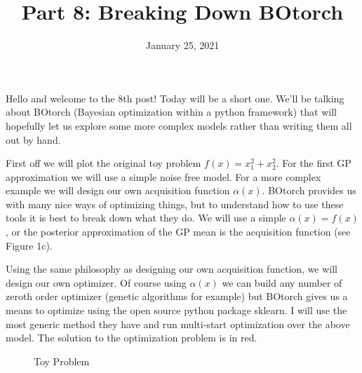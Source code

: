 \documentclass[12pt]{article}
\title{\textbf{Part 8: Breaking Down BOtorch}}
\begin{document}
\date{January 25, 2021}
\maketitle

Hello and welcome to the 8th post! Today will be a short one. We'll be talking about BOtorch (Bayesian optimization within a python framework) that will hopefully let us explore some more complex models rather than writing them all out by hand.

\vspace{5mm}

First off we will plot the original toy problem $f(x)=x_1^2+x_2^2$. For the first GP approximation we will use a simple noise free model. For a more complex example we will design our own acquisition function $\alpha(x)$. BOtorch provides us with many nice ways of optimizing things, but to understand how to use these tools it is best to break down what they do. We will use a simple $\alpha(x)=f(x)$, or the posterior approximation of the GP mean is the acquisition function (see Figure 1c).

\vspace{5mm}

Using the same philosophy as designing our own acquisition function, we will design our own optimizer. Of course using $\alpha(x)$ we can build any number of zeroth order optimizer (genetic algorithms for example) but BOtorch gives us a means to optimize using the open source python package sklearn. I will use the most generic method they have and run multi-start optimization over the above model. The solution to the optimization problem is in red.

\begin{figure}[h]
\centering
{}
\caption{Toy Problem}
\end{figure}
\end{document}
